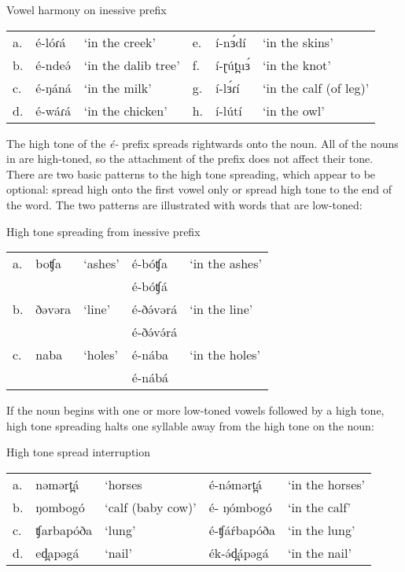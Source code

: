 \ea Vowel harmony on inessive prefix
\begin{tabular}{llllll}
a.&	é-lóɾá	&	‘in the creek’		&	e.&	í-nɜ́dí	&‘in the skins’\\
b.&	é-ndeə́	&	‘in the dalib tree’	&	f.&	í-ɽút̪uɜ́	&‘in the knot’\\
c.&	é-ŋáná	&	‘in the milk’		&	g.&	í-lɜ́ɾí	&‘in the calf (of leg)’\\
d.&	é-wáɾá	&	‘in the chicken’		&	h.&	í-lútí	&‘in the owl’\\
\end{tabular}\label{ex:ch6:locativevh}
\z 

The high tone of the \textit{é-} prefix spreads rightwards onto the noun. All of the nouns in  are high-toned, so the attachment of the prefix does not affect their tone. There are two basic patterns to the high tone spreading, which appear to be optional: spread high onto the first vowel only or spread high tone to the end of the word. The two patterns are illustrated with words that are low-toned:

\ea High tone spreading	from inessive prefix\\
\begin{tabular}[t]{lllll}
a.&	boʧa	&	‘ashes’		&é-bóʧa	&‘in the ashes’\\
 &			&		 	 &	 	é-bóʧá	& \\
b.&	ðəvəra	&	‘line’	 	&é-ðə́vərá	&‘in the line’\\
 &			&		 	 &	 é-ðə́və́rá	& \\
c.&	naba	&	‘holes’		&é-nába	&‘in the holes’\\
 &			&		 	 &	 é-nábá &	\\
\end{tabular}
\z 

If the noun begins with one or more low-toned vowels followed by a high tone, high tone spreading halts one syllable away from the high tone on the noun:

\ea	High tone spread interruption\\
\begin{tabular}[t]{lllll} 
a.&	nəmərt̪á		&	‘horses			&	é-nə́mərt̪á	&	‘in the horses’\\
b.&	ŋombogó		&	‘calf (baby cow)’&	 	é- ŋómbogó	&	‘in the calf’\\
c.&	ʧarbapóða	&	‘lung’			&	é-ʧáŕbapóða	&	‘in the lung’\\
d.&	ed̪apəgá		&	‘nail’			&	ék-ə́d̪ápəgá	&	‘in the nail’\\
\end{tabular}
\z 

